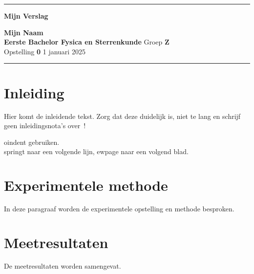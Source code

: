 \documentclass[10pt,a4paper,twoside]{article}
\begin{document}
\begin{center}
\hrule

\vspace{.4cm}
{\bf {\Huge Mijn Verslag}}
\vspace{.2cm}
\end{center}
{\bf Mijn Naam}  \\
{\bf Eerste Bachelor Fysica en Sterrenkunde} \hspace{\fill} Groep {\bf Z}\\
Opstelling {\bf 0 } \hspace{\fill}  1 januari 2025 \\
\hrule


\section{Inleiding}

Hier komt de inleidende tekst. Zorg dat deze duidelijk is, niet te lang en schrijf geen inleidingsnota's over~!

oindent gebruiken.  \\ springt naar een volgende lijn, 
ewpage naar een volgend blad.


\section{Experimentele methode}
In deze paragraaf worden de experimentele opstelling en methode besproken.


\section{Meetresultaten}
De meetresultaten worden samengevat.  
\end{document}
